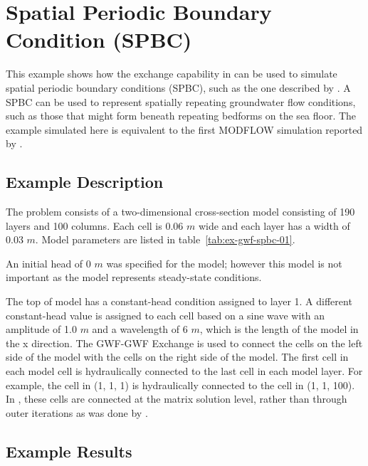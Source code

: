 \section{Spatial Periodic Boundary Condition (SPBC)}

This example shows how the exchange capability in \mf can be used to simulate spatial periodic boundary conditions (SPBC), such as the one described by \cite{laattoe2014spatial}.  A SPBC can be used to represent spatially repeating groundwater flow conditions, such as those that might form beneath repeating bedforms on the sea floor.  The example simulated here is equivalent to the first MODFLOW simulation reported by \cite{laattoe2014spatial}.  

\subsection{Example Description}

The problem consists of a two-dimensional cross-section model consisting of 190 layers and 100 columns.  Each cell is 0.06 $m$ wide and each layer has a width of 0.03 $m$.  Model parameters are listed in table~\ref{tab:ex-gwf-spbc-01}. 



An initial head of 0 $m$ was specified for the model; however this model is not important as the model represents steady-state conditions.

The top of model has a constant-head condition assigned to layer 1.  A different constant-head value is assigned to each cell based on a sine wave with an amplitude of 1.0 $m$ and a wavelength of 6 $m$, which is the length of the model in the x direction.  The GWF-GWF Exchange is used to connect the cells on the left side of the model with the cells on the right side of the model.  The first cell in each model cell is hydraulically connected to the last cell in each model layer.  For example, the cell in (1, 1, 1) is hydraulically connected to the cell in (1, 1, 100).  In \mf, these cells are connected at the matrix solution level, rather than through outer iterations as was done by \cite{laattoe2014spatial}.  

\subsection{Example Results}

